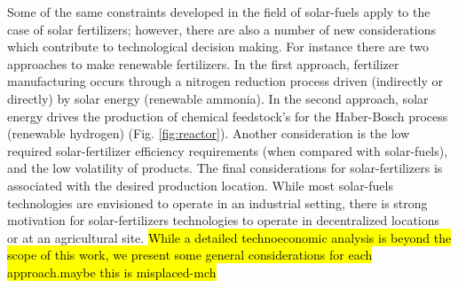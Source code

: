 Some of the same constraints developed in the field of solar-fuels apply to the case of solar fertilizers; however, there are also a number of new considerations which contribute to technological decision making. For instance there are two approaches to make renewable fertilizers. In the first approach, fertilizer manufacturing occurs through a nitrogen reduction process driven (indirectly or directly) by solar energy (renewable ammonia). In the second approach, solar energy drives the production of chemical feedstock’s for the Haber-Bosch process (renewable hydrogen)  (Fig. \ref{fig:reactor}). Another consideration is the low required solar-fertilizer efficiency requirements (when compared with solar-fuels), and the low volatility of products. The final considerations for solar-fertilizers is associated with the desired production location.  While most solar-fuels technologies are envisioned to operate in an industrial setting, there is strong motivation for solar-fertilizers technologies to operate in decentralized locations or at an agricultural site. \hl{While a detailed technoeconomic analysis is beyond the scope of this work, we present some general considerations for each approach.maybe this is misplaced-mch}

